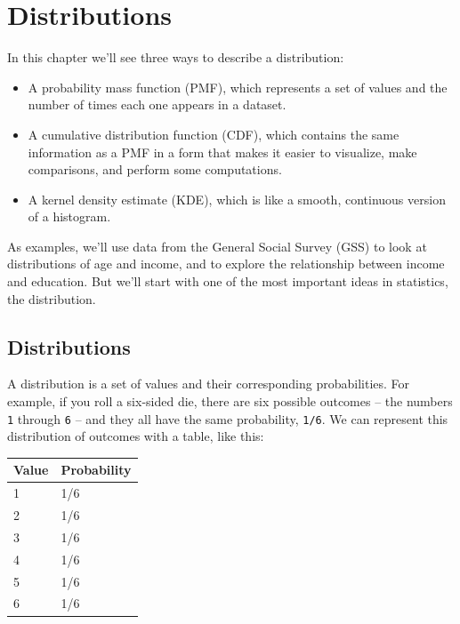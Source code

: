 \hypertarget{distributions}{%
\chapter{Distributions}\label{distributions}}

In this chapter we'll see three ways to describe a distribution:

\begin{itemize}
\item
  A probability mass function (PMF), which represents a set of values
  and the number of times each one appears in a dataset.
\item
  A cumulative distribution function (CDF), which contains the same
  information as a PMF in a form that makes it easier to visualize, make
  comparisons, and perform some computations.
\item
  A kernel density estimate (KDE), which is like a smooth, continuous
  version of a histogram.
\end{itemize}

As examples, we'll use data from the General Social Survey (GSS) to look
at distributions of age and income, and to explore the relationship
between income and education. But we'll start with one of the most
important ideas in statistics, the distribution.

\hypertarget{distributions-1}{%
\section{Distributions}\label{distributions-1}}

A distribution is a set of values and their corresponding probabilities.
For example, if you roll a six-sided die, there are six possible
outcomes -- the numbers \passthrough{\lstinline!1!} through
\passthrough{\lstinline!6!} -- and they all have the same probability,
\passthrough{\lstinline!1/6!}. We can represent this distribution of
outcomes with a table, like this:

\begin{longtable}[]{@{}ll@{}}
\midrule()
Value & Probability \\
\midrule()
\endhead
1 & 1/6 \\
2 & 1/6 \\
3 & 1/6 \\
4 & 1/6 \\
5 & 1/6 \\
6 & 1/6 \\
\midrule()
\end{longtable}

